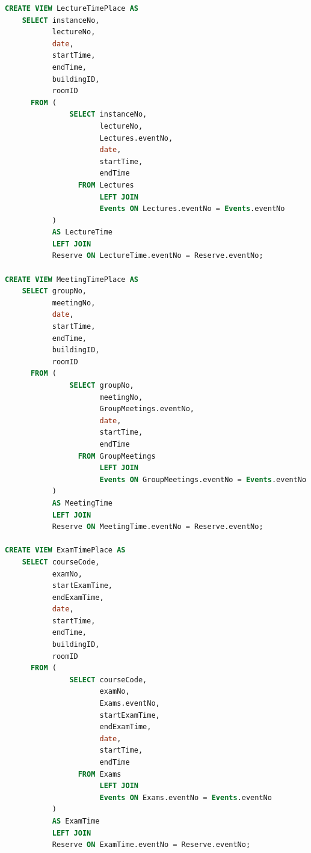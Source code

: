 \documentclass{article}
\begin{document}
\begin{lstlisting}[language=SQL]
CREATE VIEW LectureTimePlace AS
    SELECT instanceNo,
           lectureNo,
           date,
           startTime,
           endTime,
           buildingID,
           roomID
      FROM (
               SELECT instanceNo,
                      lectureNo,
                      Lectures.eventNo,
                      date,
                      startTime,
                      endTime
                 FROM Lectures
                      LEFT JOIN
                      Events ON Lectures.eventNo = Events.eventNo
           )
           AS LectureTime
           LEFT JOIN
           Reserve ON LectureTime.eventNo = Reserve.eventNo;

CREATE VIEW MeetingTimePlace AS
    SELECT groupNo,
           meetingNo,
           date,
           startTime,
           endTime,
           buildingID,
           roomID
      FROM (
               SELECT groupNo,
                      meetingNo,
                      GroupMeetings.eventNo,
                      date,
                      startTime,
                      endTime
                 FROM GroupMeetings
                      LEFT JOIN
                      Events ON GroupMeetings.eventNo = Events.eventNo
           )
           AS MeetingTime
           LEFT JOIN
           Reserve ON MeetingTime.eventNo = Reserve.eventNo;

CREATE VIEW ExamTimePlace AS
    SELECT courseCode,
           examNo,
           startExamTime,
           endExamTime,
           date,
           startTime,
           endTime,
           buildingID,
           roomID
      FROM (
               SELECT courseCode,
                      examNo,
                      Exams.eventNo,
                      startExamTime,
                      endExamTime,
                      date,
                      startTime,
                      endTime
                 FROM Exams
                      LEFT JOIN
                      Events ON Exams.eventNo = Events.eventNo
           )
           AS ExamTime
           LEFT JOIN
           Reserve ON ExamTime.eventNo = Reserve.eventNo;
\end{lstlisting}
\end{document}
